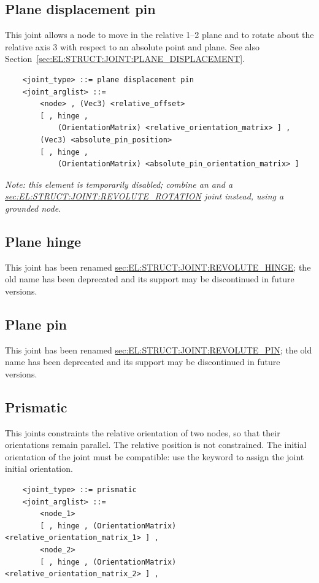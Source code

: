 \subsection{Plane displacement pin}
This joint allows a node to move in the relative 1--2 plane 
and to rotate about the relative axis 3 with respect to an absolute point 
and plane.
See also Section~\ref{sec:EL:STRUCT:JOINT:PLANE_DISPLACEMENT}.
\begin{verbatim}
    <joint_type> ::= plane displacement pin
    <joint_arglist> ::= 
        <node> , (Vec3) <relative_offset>
        [ , hinge , 
            (OrientationMatrix) <relative_orientation_matrix> ] ,
        (Vec3) <absolute_pin_position>
        [ , hinge , 
            (OrientationMatrix) <absolute_pin_orientation_matrix> ]
\end{verbatim}
\emph{Note: this element is temporarily disabled;
combine an  and a
\hyperref{\kw{revolute rotation}}{\kw{revolute rotation} (see Section~}{)}{sec:EL:STRUCT:JOINT:REVOLUTE_ROTATION}
joint instead, using a grounded node.}


\subsection{Plane hinge}
This joint has been renamed
\hyperref{\kw{revolute hinge}}{\kw{revolute hinge} (see Section~}{)}{sec:EL:STRUCT:JOINT:REVOLUTE_HINGE};
the old name has been deprecated and its support may be discontinued
in future versions.

\subsection{Plane pin}
This joint has been renamed
\hyperref{\kw{revolute pin}}{\kw{revolute pin} (see Section~}{)}{sec:EL:STRUCT:JOINT:REVOLUTE_PIN};
the old name has been deprecated and its support may be discontinued
in future versions.

\subsection{Prismatic}
This joints constraints the relative orientation of two nodes, so that
their orientations remain parallel.
The relative position is not constrained.
The initial orientation of the joint must be
compatible: use the  keyword to assign 
the joint initial orientation.
\begin{verbatim}
    <joint_type> ::= prismatic
    <joint_arglist> ::= 
        <node_1>
        [ , hinge , (OrientationMatrix) <relative_orientation_matrix_1> ] ,
        <node_2> 
        [ , hinge , (OrientationMatrix) <relative_orientation_matrix_2> ] ,    
\end{verbatim}

